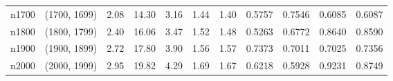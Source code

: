 \begin{tabular}{llrrrrrrrrr}
   n1700 & (1700, 1699) &  2.08 & 14.30 & 3.16 &  1.44 &   1.40 &   0.5757 &   0.7546 &     0.6085 &      0.6087 \\
   n1800 & (1800, 1799) &  2.40 & 16.06 & 3.47 &  1.52 &   1.48 &   0.5263 &   0.6772 &     0.8640 &      0.8590 \\
   n1900 & (1900, 1899) &  2.72 & 17.80 & 3.90 &  1.56 &   1.57 &   0.7373 &   0.7011 &     0.7025 &      0.7356 \\
   n2000 & (2000, 1999) &  2.95 & 19.82 & 4.29 &  1.69 &   1.67 &   0.6218 &   0.5928 &     0.9231 &      0.8749 \\
\bottomrule
\end{tabular}
